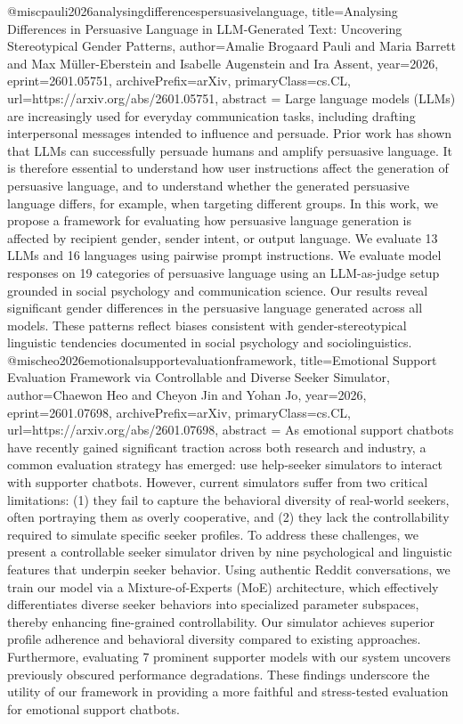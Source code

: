 {}@misc{pauli2026analysingdifferencespersuasivelanguage,
      title={Analysing Differences in Persuasive Language in LLM-Generated Text: Uncovering Stereotypical Gender Patterns}, 
      author={Amalie Brogaard Pauli and Maria Barrett and Max Müller-Eberstein and Isabelle Augenstein and Ira Assent},
      year={2026},
      eprint={2601.05751},
      archivePrefix={arXiv},
      primaryClass={cs.CL},
      url={https://arxiv.org/abs/2601.05751},
      abstract = {Large language models (LLMs) are increasingly used for everyday communication tasks, including drafting interpersonal messages intended to influence and persuade. Prior work has shown that LLMs can successfully persuade humans and amplify persuasive language. It is therefore essential to understand how user instructions affect the generation of persuasive language, and to understand whether the generated persuasive language differs, for example, when targeting different groups. In this work, we propose a framework for evaluating how persuasive language generation is affected by recipient gender, sender intent, or output language. We evaluate 13 LLMs and 16 languages using pairwise prompt instructions. We evaluate model responses on 19 categories of persuasive language using an LLM-as-judge setup grounded in social psychology and communication science. Our results reveal significant gender differences in the persuasive language generated across all models. These patterns reflect biases consistent with gender-stereotypical linguistic tendencies documented in social psychology and sociolinguistics.}
}@misc{heo2026emotionalsupportevaluationframework,
      title={Emotional Support Evaluation Framework via Controllable and Diverse Seeker Simulator}, 
      author={Chaewon Heo and Cheyon Jin and Yohan Jo},
      year={2026},
      eprint={2601.07698},
      archivePrefix={arXiv},
      primaryClass={cs.CL},
      url={https://arxiv.org/abs/2601.07698},
      abstract = {As emotional support chatbots have recently gained significant traction across both research and industry, a common evaluation strategy has emerged: use help-seeker simulators to interact with supporter chatbots. However, current simulators suffer from two critical limitations: (1) they fail to capture the behavioral diversity of real-world seekers, often portraying them as overly cooperative, and (2) they lack the controllability required to simulate specific seeker profiles. To address these challenges, we present a controllable seeker simulator driven by nine psychological and linguistic features that underpin seeker behavior. Using authentic Reddit conversations, we train our model via a Mixture-of-Experts (MoE) architecture, which effectively differentiates diverse seeker behaviors into specialized parameter subspaces, thereby enhancing fine-grained controllability. Our simulator achieves superior profile adherence and behavioral diversity compared to existing approaches. Furthermore, evaluating 7 prominent supporter models with our system uncovers previously obscured performance degradations. These findings underscore the utility of our framework in providing a more faithful and stress-tested evaluation for emotional support chatbots.}
}

